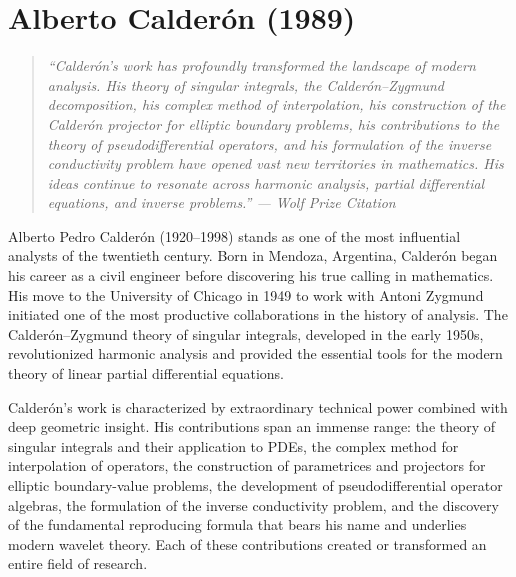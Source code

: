 \let\R\relax
\newcommand{\R}{\mathbb{R}}
\let\C\relax
\newcommand{\C}{\mathbb{C}}
\let\N\relax
\newcommand{\N}{\mathbb{N}}
\let\Z\relax
\newcommand{\Z}{\mathbb{Z}}
\let\supp\relax
\newcommand{\supp}{\operatorname{supp}}
\let\pvp\relax
\newcommand{\pvp}{\operatorname{p.v.}}

\chapter{Alberto Calder\'{o}n (1989)}

\begin{quote}
\it ``Calder\'{o}n's work has profoundly transformed the landscape of modern analysis. His theory of singular integrals, the Calder\'{o}n--Zygmund decomposition, his complex method of interpolation, his construction of the Calder\'{o}n projector for elliptic boundary problems, his contributions to the theory of pseudodifferential operators, and his formulation of the inverse conductivity problem have opened vast new territories in mathematics. His ideas continue to resonate across harmonic analysis, partial differential equations, and inverse problems.'' --- Wolf Prize Citation
\end{quote}

Alberto Pedro Calder\'{o}n (1920--1998) stands as one of the most influential analysts of the twentieth century. Born in Mendoza, Argentina, Calder\'{o}n began his career as a civil engineer before discovering his true calling in mathematics. His move to the University of Chicago in 1949 to work with Antoni Zygmund initiated one of the most productive collaborations in the history of analysis. The Calder\'{o}n--Zygmund theory of singular integrals, developed in the early 1950s, revolutionized harmonic analysis and provided the essential tools for the modern theory of linear partial differential equations.

Calder\'{o}n's work is characterized by extraordinary technical power combined with deep geometric insight. His contributions span an immense range: the theory of singular integrals and their application to PDEs, the complex method for interpolation of operators, the construction of parametrices and projectors for elliptic boundary-value problems, the development of pseudodifferential operator algebras, the formulation of the inverse conductivity problem, and the discovery of the fundamental reproducing formula that bears his name and underlies modern wavelet theory. Each of these contributions created or transformed an entire field of research.

